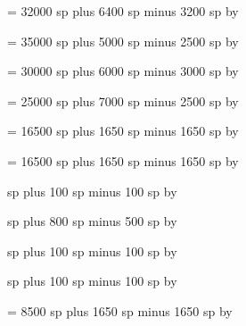 \newskip\interwordspacenotes
\interwordspacenotes = 32000 sp plus 6400 sp minus 3200 sp
\multiply\interwordspacenotes by \factor

\newskip\interwordspacenotestext
\interwordspacenotestext = 35000 sp plus 5000 sp minus 2500 sp
\multiply\interwordspacenotestext by \factor

\newskip\interwordspacetextnotes
\interwordspacetextnotes = 30000 sp plus 6000 sp minus 3000 sp
\multiply\interwordspacetextnotes by \factor

\newskip\interwordspacetext
\interwordspacetext = 25000 sp plus 7000 sp minus 2500 sp
\multiply\interwordspacetext by \factor

\newskip\bispace
\bispace = 16500 sp plus 1650 sp minus 1650 sp
\multiply\bispace by \factor

\newskip\trispace
\trispace = 16500 sp plus 1650 sp minus 1650 sp
\multiply\trispace by \factor

\newskip\punctuminclinatumshift
{} sp plus 100 sp minus 100 sp
\multiply\punctuminclinatumshift by \factor

\newskip\beforepunctainclinatashift
{} sp plus 800 sp minus 500 sp
\multiply\beforepunctainclinatashift by \factor

\newskip\punctuminclinatumanddebilisshift
{} sp plus 100 sp minus 100 sp
\multiply\punctuminclinatumanddebilisshift by \factor

\newskip\punctuminclinatumdebilisshift
{} sp plus 100 sp minus 100 sp
\multiply\punctuminclinatumdebilisshift by \factor

\newskip\spacebeforesmallbar
\spacebeforesmallbar = 8500 sp plus 1650 sp minus 1650 sp
\multiply\spacebeforesmallbar by \factor

